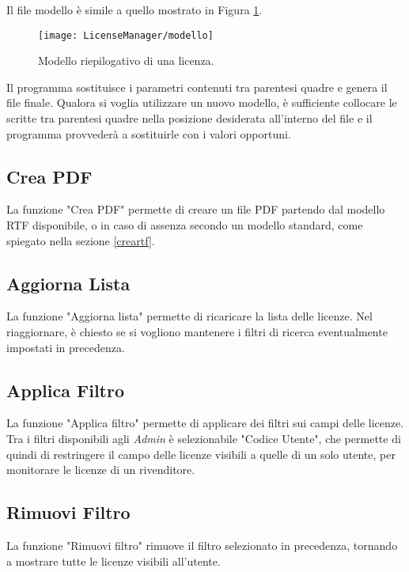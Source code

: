 Il file modello è simile a quello mostrato in Figura \ref{modello}.

\begin{figure}[!h] 
    \centering 
    \texttt{[image: LicenseManager/modello]} 
    \caption{Modello riepilogativo di una licenza.}
\label{modello}

\end{figure}

Il programma sostituisce i parametri contenuti tra parentesi quadre e genera il file finale. Qualora si voglia utilizzare un nuovo modello, è sufficiente collocare le scritte tra parentesi quadre nella posizione desiderata all’interno del file e il programma provvederà a sostituirle con i valori opportuni.

\subsection{Crea PDF}

La funzione "Crea PDF" permette di creare un file PDF partendo dal modello RTF disponibile, o in caso di assenza secondo un modello standard, come spiegato nella sezione \ref{creartf}.

\subsection{Aggiorna Lista}
La funzione "Aggiorna lista" permette di ricaricare la lista delle licenze. Nel riaggiornare, è chiesto se si vogliono mantenere i filtri di ricerca eventualmente impostati in precedenza.

\subsection{Applica Filtro}
La funzione "Applica filtro" permette di applicare dei filtri sui campi delle licenze. Tra i filtri disponibili agli \textit{Admin} è selezionabile "Codice Utente", che permette di quindi di restringere il campo delle licenze visibili a quelle di un solo utente, per monitorare le licenze di un rivenditore.

\subsection{Rimuovi Filtro}
La funzione "Rimuovi filtro" rimuove il filtro selezionato in precedenza, tornando a mostrare tutte le licenze visibili all’utente.


